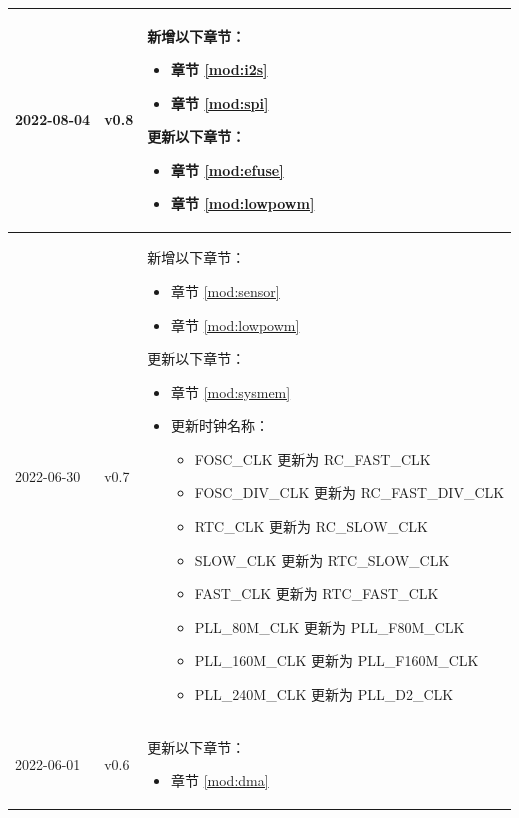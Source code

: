 \begin{longtable}[l]{ | m{2cm} | m{1.5cm} | m{12cm} | }
    2022-08-04     & v0.8  &
    新增以下章节：
    \begin{itemize}
        \item 章节 \ref{mod:i2s} \textit{\nameref{mod:i2s}}
        \item 章节 \ref{mod:spi} \textit{\nameref{mod:spi}}
    \end{itemize}
    更新以下章节：
    \begin{itemize}
        \item 章节 \ref{mod:efuse} \textit{\nameref{mod:efuse}} %
        \item 章节 \ref{mod:lowpowm} \textit{\nameref{mod:lowpowm}} %
    \end{itemize}
    \\\hline
    2022-06-30     & v0.7  &
    新增以下章节：
    \begin{itemize}
        \item 章节 \ref{mod:sensor} \textit{\nameref{mod:sensor}}
        \item 章节 \ref{mod:lowpowm} \textit{\nameref{mod:lowpowm}}
    \end{itemize}
    更新以下章节：
    \begin{itemize}
        \item 章节 \ref{mod:sysmem} \textit{\nameref{mod:sysmem}}
        \item 更新时钟名称：
        \begin{itemize}
        \item FOSC\_CLK 更新为 RC\_FAST\_CLK
        \item FOSC\_DIV\_CLK 更新为 RC\_FAST\_DIV\_CLK
        \item RTC\_CLK 更新为 RC\_SLOW\_CLK
        \item SLOW\_CLK 更新为 RTC\_SLOW\_CLK
        \item FAST\_CLK 更新为 RTC\_FAST\_CLK
        \item PLL\_80M\_CLK 更新为 PLL\_F80M\_CLK
        \item PLL\_160M\_CLK 更新为 PLL\_F160M\_CLK
        \item PLL\_240M\_CLK 更新为 PLL\_D2\_CLK
    \end{itemize}%
    \end{itemize}
    \\\hline
    2022-06-01     & v0.6  &
    更新以下章节：
    \begin{itemize}
        \item 章节 \ref{mod:dma} \textit{\nameref{mod:dma}}

\end{itemize}
\end{longtable}
